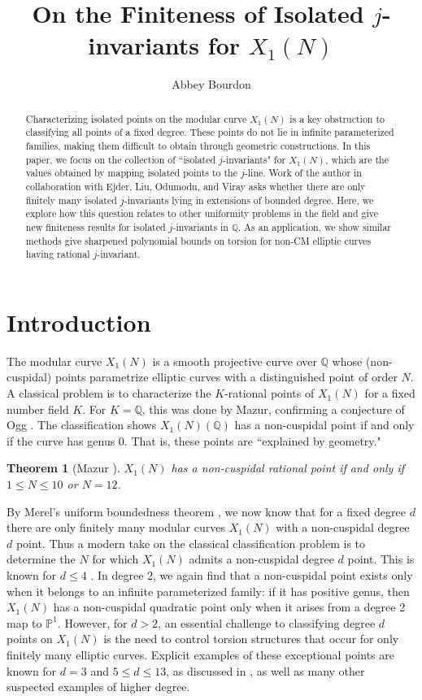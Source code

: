 \documentclass{amsart}
\title{On the Finiteness of Isolated $j$-invariants for $X_1(N)$}
\author{Abbey Bourdon}
\newtheorem{theorem}{Theorem}
\theoremstyle{definition}
\newcommand{\Q}{\mathbb{Q}}
\begin{document}
\begin{abstract}
    Characterizing isolated points on the modular curve $X_1(N)$ is a key obstruction to classifying all points of a fixed degree. These points do not lie in infinite parameterized families, making them difficult to obtain through geometric constructions. In this paper, we focus on the collection of ``isolated $j$-invariants" for $X_1(N)$, which are the values obtained by mapping isolated points to the $j$-line. Work of the author in collaboration with Ejder, Liu, Odumodu, and Viray \cite{BELOV} asks whether there are only finitely many isolated $j$-invariants lying in extensions of bounded degree. Here, we explore how this question relates to other uniformity problems in the field and give new finiteness results for isolated $j$-invariants in $\Q$. As an application, we show similar methods give sharpened polynomial bounds on torsion for non-CM elliptic curves having rational $j$-invariant.
\end{abstract}

\maketitle

\section{Introduction}
The modular curve $X_1(N)$ is a smooth projective curve over $\Q$ whose (non-cuspidal) points parametrize elliptic curves with a distinguished point of order $N$. A classical problem is to characterize the $K$-rational points of $X_1(N)$ for a fixed number field $K$. For $K=\Q$, this was done by Mazur, confirming a conjecture of Ogg \cite{OggConjecture}. The classification shows $X_1(N)(\Q)$  has a non-cuspidal point if and only if the curve has genus 0. That is, these points are ``explained by geometry." 

\begin{theorem}[Mazur \cite{mazur77}]
    $X_1(N)$ has a non-cuspidal rational point if and only if $1 \leq N \leq 10$ or $N=12$.
\end{theorem} 
By Merel's uniform boundedness theorem \cite{Merel96}, we now know that for a fixed degree $d$ there are only finitely many modular curves $X_1(N)$ with a non-cuspidal degree $d$ point. Thus a modern take on the classical classification problem is to determine the $N$ for which $X_1(N)$ admits a non-cuspidal degree $d$ point. This is known for $d \leq 4$ \cite{mazur77, kenkudegleq3, kamienny2degleq3, DEvHMZB2021, classificationdeg4points}. In degree 2, we again find that a non-cuspidal point exists only when it belongs to an infinite parameterized family: if it has positive genus, then $X_1(N)$ has a non-cuspidal quadratic point only when it arises from a degree 2 map to $\mathbb{P}^1$. However, for $d>2$, an essential challenge to classifying degree $d$ points on $X_1(N)$ is the need to control torsion structures that occur for only finitely many elliptic curves. Explicit examples of these exceptional points are known for $d=3$ and $5 \leq d \leq 13$, as discussed in \cite[Appendix A]{classificationdeg4points}, as well as many other suspected examples of higher degree.
\end{document}
